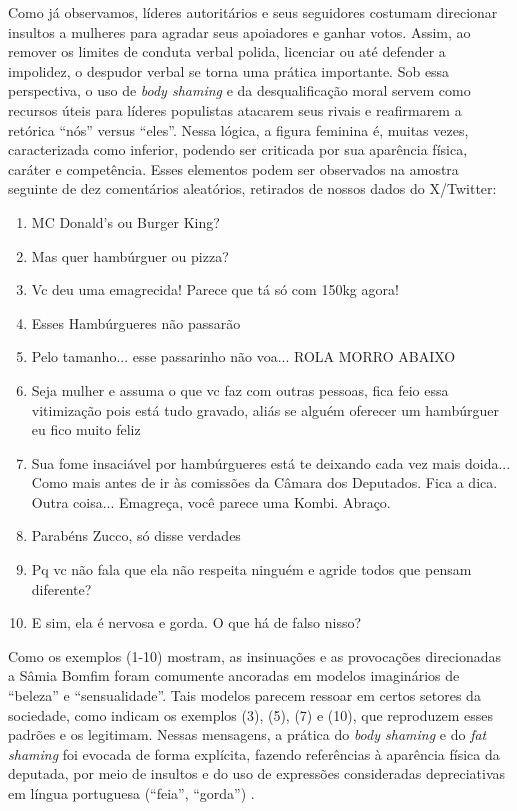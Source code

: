 \documentclass[portuguese]{textolivre}
\begin{document}
Como já observamos, líderes autoritários e seus seguidores costumam direcionar insultos a mulheres para agradar seus apoiadores e ganhar votos. Assim, ao remover os limites de conduta verbal polida, licenciar ou até defender a impolidez, o despudor verbal se torna uma prática importante. Sob essa perspectiva, o uso de \textit{body shaming} e da desqualificação moral servem como recursos úteis para líderes populistas atacarem seus rivais e reafirmarem a retórica ``nós'' versus ``eles''. Nessa lógica, a figura feminina é, muitas vezes, caracterizada como inferior, podendo ser criticada por sua aparência física, caráter e competência. Esses elementos podem ser observados na amostra seguinte de dez comentários aleatórios, retirados de nossos dados do X/Twitter:

\medskip
\begin{enumerate}
\item MC Donald's ou Burger King?
\item Mas quer hambúrguer ou pizza?
\item Vc deu uma emagrecida! Parece que tá só com 150kg agora!
\item Esses Hambúrgueres não passarão
\item Pelo tamanho... esse passarinho não voa... ROLA MORRO ABAIXO {\Symbola 🤣🤣🤣🤣🤣🤣}
\item Seja mulher e assuma o que vc faz com outras pessoas, fica feio essa vitimização pois está tudo gravado, aliás se alguém oferecer um hambúrguer eu fico muito feliz {\Symbola 🤣}
\item Sua fome insaciável por hambúrgueres está te deixando cada vez mais doida... Como mais antes de ir às comissões da Câmara dos Deputados. Fica a dica. Outra coisa... Emagreça, você parece uma Kombi. Abraço.
\item Parabéns Zucco, só disse verdades
\item Pq vc não fala que ela não respeita ninguém e agride todos que pensam diferente?
\item E sim, ela é nervosa e gorda. O que há de falso nisso?
\end{enumerate}
\medskip

Como os exemplos (1-10) mostram, as insinuações e as provocações direcionadas a Sâmia Bomfim foram comumente ancoradas em modelos imaginários de ``beleza'' e ``sensualidade''. Tais modelos parecem ressoar em certos setores da sociedade, como indicam os exemplos (3), (5), (7) e (10), que reproduzem esses padrões e os legitimam. Nessas mensagens, a prática do \textit{body shaming} e do \textit{fat shaming} foi evocada de forma explícita, fazendo referências à aparência física da deputada, por meio de insultos e do uso de expressões consideradas depreciativas em língua portuguesa (``feia'', ``gorda'') \cite{oliveira2022}.
\end{document}
